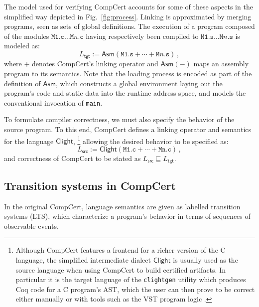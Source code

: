 \documentclass[sigplan,10pt,review,anonymous]{acmart}
\newcommand{\kw}[1]{\ensuremath{ \mathsf{#1} }}
\begin{document}
The model used for verifying CompCert accounts for
some of these aspects in the simplified way
depicted in Fig.~\ref{fig:process}.
Linking is approximated by
merging programs, seen as sets of global definitions.
The execution
of a program composed of the modules
$\texttt{M1.c} \ldots \texttt{M$n$.c}$
having respectively been compiled to
$\texttt{M1.s} \ldots \texttt{M$n$.s}$
is modeled as:
\[
    L_\kw{tgt} :=
    \kw{Asm}(\texttt{M1.s} +
             \cdots +
             \texttt{M$n$.s}) \,,
\]
where
$+$ denotes CompCert's linking operator and
$\kw{Asm}(-)$ maps an assembly program to its semantics.
Note that the loading process is encoded
as part of the definition of $\kw{Asm}$,
which constructs a global environment
laying out the program's code and static data
into the runtime address space,
and models the conventional invocation of \texttt{main}.

To formulate compiler correctness,
we must also specify the behavior of the source program.
To this end,
CompCert defines a linking operator
and semantics
for the language $\kw{Clight}$,%
\footnote{
  Although CompCert features a frontend for a richer version
  of the C language,
  the simplified intermediate dialect \kw{Clight}
  is usually used as the source language
  when using CompCert to build certified artifacts.
  In particular it is the target language of the
  \texttt{clightgen} utility which
  produces Coq code for a C program's AST,
  which the user can then prove to be correct
  either manually or with tools such as the VST program logic
  \cite{vst}.
}
allowing the desired behavior to be specified as:
\[
    L_\kw{src} :=
    \kw{Clight}(\texttt{M1.c} + \cdots + \texttt{Mn.c}) \,,
\]
and correctness of CompCert
to be stated as $L_\kw{src} \sqsubseteq L_\kw{tgt}$.


\subsection{Transition systems in CompCert} \label{sec:sem:closed} %

In the original CompCert, language semantics are
given as labelled transition systems (LTS),
which characterize a program's behavior in terms of
sequences of observable events.
\end{document}

